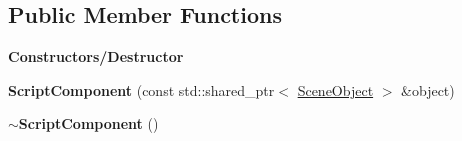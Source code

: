 \subsection*{Public Member Functions}
\begin{Indent}\textbf{ Constructors/\+Destructor}\par
\begin{DoxyCompactItemize}
\item 
\mbox{\label{classrev_1_1_script_component_ab86660c4d414d96e323ef85e2ba55f5c}} 
{\bfseries Script\+Component} (const std\+::shared\+\_\+ptr$<$ \mbox{\hyperlink{classrev_1_1_scene_object}{Scene\+Object}} $>$ \&object)
\item 
\mbox{\label{classrev_1_1_script_component_a1857b906d42f5a81de6f6f76bfb81b33}} 
{\bfseries $\sim$\+Script\+Component} ()
\end{DoxyCompactItemize}
\end{Indent}
